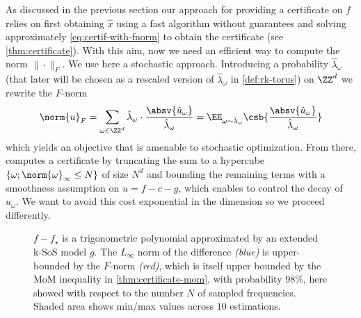 \documentclass{article}
\begin{document}
As discussed in the previous section our approach for providing a certificate on $f$ relies on first obtaining $\widehat{x}$ using a fast algorithm without guarantees and solving approximately \cref{eq:certif-with-fnorm} to obtain the certificate (see \cref{thm:certificate}). With this aim, now we need an efficient way to compute the norm $\|\cdot\|_F$. We use here a stochastic approach. Introducing a probability $\hat{\lambda}_\omega$ (that later will be chosen as a rescaled version of $\hat{\lambda}_\omega$ in \cref{def:rk-torus}) on $\ZZ^d$ we rewrite the $F$-norm
\begin{equation}\label{eq:fnorm-expectation}
  \norm{u}_F = \sum_{\omega \in \ZZ^d} \hat{\lambda}_\omega \cdot \frac{\absv{\hat{u}_\omega}}{\hat{\lambda}_\omega} = \EE_{\omega \sim \hat{\lambda}_\omega} \csb{\frac{\absv{\hat{u}_\omega}}{\hat{\lambda}_\omega}}
\end{equation}
which yields an objective that is amenable to stochastic optimization. From there, \cite{woodworthNonConvexOptimizationCertificates2022} computes a certificate by truncating the sum to a hypercube $\{ \omega; \norm{\omega}_{\infty} \leq N \}$ of size $N^d$ and bounding the remaining terms with a smoothness assumption on $u = f - c - g$, which enables to control the decay of $\hat{u}_\omega$. We want to avoid this cost exponential in the dimension so we proceed differently.

\begin{figure}[h]
  \centering
  
  \caption{$f - f_\star$ is a trigonometric polynomial approximated by an extended k-SoS model $g$. The $L_\infty$ norm of the difference \emph{(blue)} is upper-bounded by the $F$-norm \emph{(red)}, which is itself upper bounded by the MoM inequality in \cref{thm:certificate-mom}, with probability $98\%$, here showed with respect to the number $N$ of sampled frequencies. Shaded area shows min/max values across $10$ estimations.}
  \label{fig:fourier_fnorm}
\end{figure}
\end{document}
